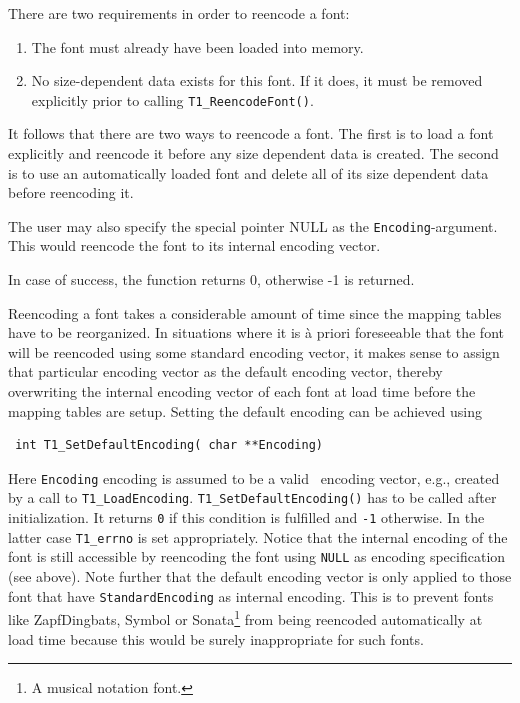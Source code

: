 There are two requirements
in order to reencode a font:
\begin{enumerate}
\item The font must already have been loaded into memory. 
\item No size-dependent data exists for this font. If
  it does, it must be removed explicitly prior to calling
  \verb+T1_ReencodeFont()+. 
\end{enumerate}

It follows that there are two ways to reencode a font. The first is
to load a font explicitly and reencode it before any size dependent
data is created. The second is to use an automatically loaded font
and delete all of its size dependent data before reencoding it.

The user may also specify the special pointer NULL as the
\verb+Encoding+-argument. This would reencode the font to its internal
encoding vector.

In case of success, the function returns 0, otherwise -1 is returned.

Reencoding a font takes a considerable amount of time since the mapping tables
have to be reorganized. In situations where it is \`a priori foreseeable that the
font will be reencoded using some standard encoding vector, it makes sense to
assign that particular encoding vector as the default encoding vector,
thereby overwriting the internal encoding vector of each font at load time
before the mapping tables are setup. Setting the default encoding can be
achieved using 
\precorr
\begin{verbatim}
 int T1_SetDefaultEncoding( char **Encoding)
\end{verbatim}\postcorr
Here \verb+Encoding+ encoding is assumed to be a valid \tonelib\ encoding
vector, e.g., created by a call to \verb+T1_LoadEncoding+.
\verb+T1_SetDefaultEncoding()+ has to be called after initialization. It
returns \verb+0+ if this condition is fulfilled and \verb+-1+
otherwise. In the latter case \verb+T1_errno+ is set appropriately. 
Notice that the internal encoding of the font is still accessible by
reencoding the font using \verb+NULL+ as encoding specification (see above). 
Note further that the default encoding vector is only applied to those font
that have \verb+StandardEncoding+ as internal encoding. This is to prevent
fonts like ZapfDingbats, Symbol or Sonata\footnote{A musical notation font.}
from being reencoded automatically at load time because this would be
surely inappropriate for such fonts.

